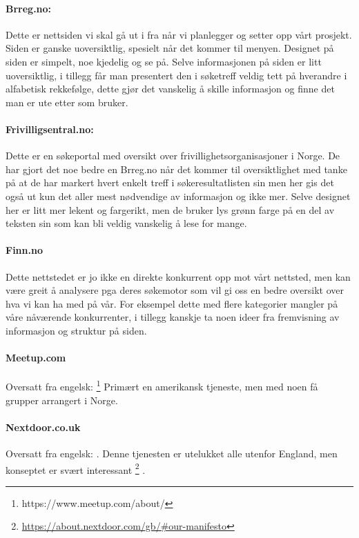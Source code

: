 \paragraph{Brreg.no:}
Dette er nettsiden vi skal gå ut i fra når vi planlegger og setter opp vårt prosjekt.
Siden er ganske uoversiktlig, spesielt når det kommer til menyen.
Designet på siden er simpelt, noe kjedelig og se på.
Selve informasjonen på siden er litt uoversiktlig, i tillegg får man presentert den i søketreff veldig tett på hverandre i alfabetisk rekkefølge, dette gjør det vanskelig å skille informasjon og finne det man er ute etter som bruker.

\paragraph{Frivilligsentral.no:}
Dette er en søkeportal med oversikt over frivillighetsorganisasjoner i Norge. De har gjort det noe bedre en Brreg.no når det kommer til oversiktlighet med tanke på at de har markert hvert enkelt treff i søkeresultatlisten sin men her gis det også ut kun det aller mest nødvendige av informasjon og ikke mer. Selve designet her er litt mer lekent og fargerikt, men de bruker lys grønn farge på en del av teksten sin som kan bli veldig vanskelig å lese for mange.

\paragraph{Finn.no}
Dette nettstedet er jo ikke en direkte konkurrent opp mot vårt nettsted, men kan være greit å analysere pga deres søkemotor som vil gi oss en bedre oversikt over hva vi kan ha med på vår. For eksempel dette med flere kategorier mangler på våre nåværende konkurrenter, i tillegg kanskje ta noen ideer fra fremvisning av informasjon og struktur på siden.

\paragraph{Meetup.com}
Oversatt fra engelsk:
  \footnote{https://www.meetup.com/about/} Primært en amerikansk tjeneste, men med noen få grupper arrangert i Norge.


\paragraph{Nextdoor.co.uk}
Oversatt fra engelsk:
. Denne tjenesten er utelukket alle utenfor England, men konseptet er svært interessant \footnote{\url{https://about.nextdoor.com/gb/\#our-manifesto}} .

